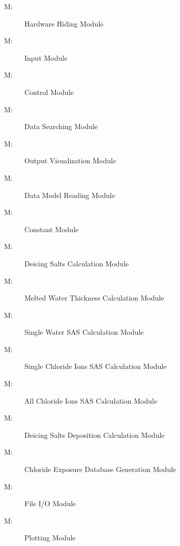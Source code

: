 \documentclass[12pt, titlepage]{article}
\newcounter{mnum}
\newcommand{\mthemnum}{M\themnum}
\begin{document}
\begin{description}
\item [ \mthemnum \label{mHardware}:] Hardware Hiding Module
\item [ \mthemnum \label{mInput}:] Input Module
\item [ \mthemnum \label{mControl}:] Control Module
\item [ \mthemnum \label{mSearch}:] Data Searching Module
\item [ \mthemnum \label{mOutput}:] Output Visualization Module
\item [ \mthemnum \label{mDataModel}:] Data Model Reading Module 
\item [ \mthemnum \label{mConstant}:] Constant Module 
\item [ \mthemnum \label{mCalculation_step1}:] Deicing Salts Calculation Module 
\item [ \mthemnum \label{mCalculation_step2}:] Melted Water Thickness Calculation Module 
\item [ \mthemnum \label{mCalculation_step3}:] Single Water SAS Calculation Module 
\item [ \mthemnum \label{mCalculation_step4}:] Single Chloride Ions SAS Calculation Module 
\item [ \mthemnum \label{mCalculation_step5}:] All Chloride Ions SAS Calculation Module 
\item [ \mthemnum \label{mCalculation_step6}:] Deicing Salts Deposition Calculation Module 
\item [ \mthemnum \label{mCalculation_result}:] Chloride Exposure Database Generation Module
\item [ \mthemnum \label{mFileIO}:] File I/O Module
\item [ \mthemnum \label{mPlot}:] Plotting Module
\end{description}
\end{document}
